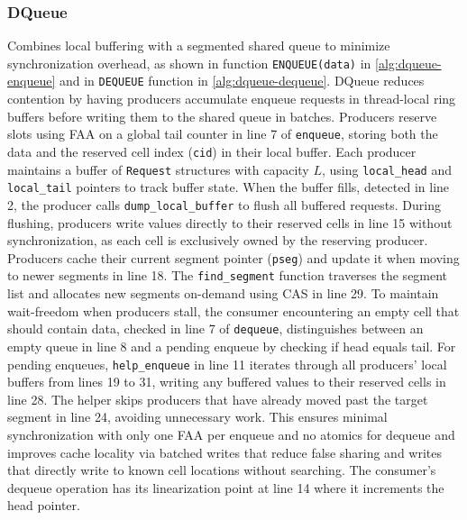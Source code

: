 \subsubsection{DQueue}
Combines local buffering with a segmented shared queue to minimize synchronization overhead, as shown in function \texttt{ENQUEUE(data)} in \cref{alg:dqueue-enqueue} and in \texttt{DEQUEUE} function in \cref{alg:dqueue-dequeue}. DQueue reduces contention by having producers accumulate enqueue requests in thread-local ring buffers before writing them to the shared queue in batches. Producers reserve slots using \ac{FAA} on a global tail counter in line 7 of \texttt{enqueue}, storing both the data and the reserved cell index (\texttt{cid}) in their local buffer. Each producer maintains a buffer of \texttt{Request} structures with capacity $L$, using \texttt{local\_head} and \texttt{local\_tail} pointers to track buffer state. When the buffer fills, detected in line 2, the producer calls \texttt{dump\_local\_buffer} to flush all buffered requests. During flushing, producers write values directly to their reserved cells in line 15 without synchronization, as each cell is exclusively owned by the reserving producer. Producers cache their current segment pointer (\texttt{pseg}) and update it when moving to newer segments in line 18. The \texttt{find\_segment} function traverses the segment list and allocates new segments on-demand using \ac{CAS} in line 29. To maintain wait-freedom when producers stall, the consumer encountering an empty cell that should contain data, checked in line 7 of \texttt{dequeue}, distinguishes between an empty queue in line 8 and a pending enqueue by checking if head equals tail. For pending enqueues, \texttt{help\_enqueue} in line 11 iterates through all producers' local buffers from lines 19 to 31, writing any buffered values to their reserved cells in line 28. The helper skips producers that have already moved past the target segment in line 24, avoiding unnecessary work. This ensures minimal synchronization with only one \ac{FAA} per enqueue and no atomics for dequeue and improves cache locality via batched writes that reduce false sharing and writes that directly write to known cell locations without searching. The consumer's dequeue operation has its linearization point at line 14 where it increments the head pointer. \cite{WangCacheCoherent}


